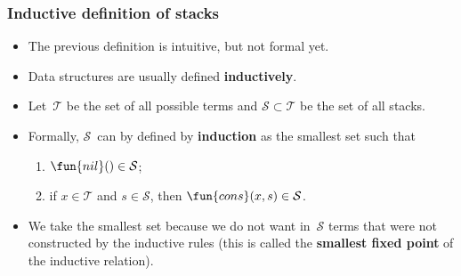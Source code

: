 \documentclass[compress,dvips,xcolor={dvipsnames},t]{beamer}
\begin{document}
\begin{frame}
  \frametitle{Inductive definition of stacks}

  \begin{itemize}

    \item The previous definition is intuitive, but not formal yet.

    \item Data structures are usually defined \textbf{inductively}.

    \item Let~\(\mathcal{T}\) be the set of all possible terms and
      \(\mathcal{S} \subset \mathcal{T}\) be the set of all stacks.

    \item Formally, \(\mathcal{S}\)~can by defined by
      \textbf{induction} as the smallest set such that
      \begin{enumerate}

        \item \(\fun{nil}() \in \mathcal{S}\);

        \item if \(x \in \mathcal{T}\) and \(s \in \mathcal{S}\), then
          \(\fun{cons}(x,s) \in \mathcal{S}\).
      \end{enumerate}

    \item We take the smallest set because we do not want
      in~\(\mathcal{S}\) terms that were not constructed by the
      inductive rules (this is called the \textbf{smallest fixed
        point} of the inductive relation).

  \end{itemize}

\end{frame}
\end{document}
